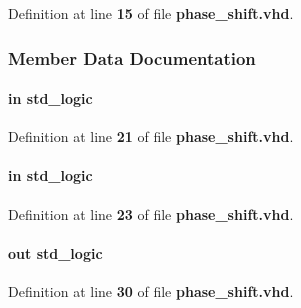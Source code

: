 Definition at line {\bf 15} of file {\bf phase\+\_\+shift.\+vhd}.



\subsubsection{Member Data Documentation}
\paragraph[{clk}]{ {\bfseries \textcolor{keywordflow}{in}\textcolor{vhdlchar}{ }} {\bfseries \textcolor{comment}{std\+\_\+logic}\textcolor{vhdlchar}{ }} \hspace{0.3cm}{\ttfamily [Port]}}\label{classphase__shift_a4a4609c199d30b3adebbeb3a01276ec5}


Definition at line {\bf 21} of file {\bf phase\+\_\+shift.\+vhd}.

\paragraph[{clk\+\_\+in}]{ {\bfseries \textcolor{keywordflow}{in}\textcolor{vhdlchar}{ }} {\bfseries \textcolor{comment}{std\+\_\+logic}\textcolor{vhdlchar}{ }} \hspace{0.3cm}{\ttfamily [Port]}}\label{classphase__shift_a185aff9b4e62fa6d187626b68df92a02}


Definition at line {\bf 23} of file {\bf phase\+\_\+shift.\+vhd}.

\paragraph[{clk\+\_\+out}]{ {\bfseries \textcolor{keywordflow}{out}\textcolor{vhdlchar}{ }} {\bfseries \textcolor{comment}{std\+\_\+logic}\textcolor{vhdlchar}{ }} \hspace{0.3cm}{\ttfamily [Port]}}\label{classphase__shift_ae27adb26486a3d3b61cf7ef6b4c122f0}


Definition at line {\bf 30} of file {\bf phase\+\_\+shift.\+vhd}.

